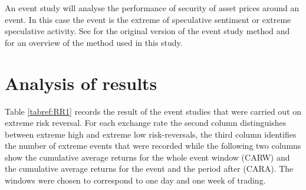 \documentclass[ijfs,article,submit,oneauthor,pdftex,10pt,a4paper]{mdpi}
\begin{document}
An event study will analyse the performance of security of asset prices around an event.  In this case the event is the extreme of speculative sentiment or extreme speculative activity.  See \citet{Dolly1933} for the original version of the event study method and \citet{FamaFisherJensenRoll} for an overview of the method used in this study. 

\section{Analysis of results}
  Table \ref{tabref:RR1} records the result of the event studies that were carried out on extreme risk reversal.   For each exchange rate the second column distinguishes between extreme high and extreme low risk-reversals, the third  column identifies the number of extreme events that were recorded while the following two columns show the cumulative average returns for the whole event window (CARW) and the cumulative average returns for the event and the period after (CARA).  The windows were chosen to correspond to one day and one week of trading.  
\end{document}
